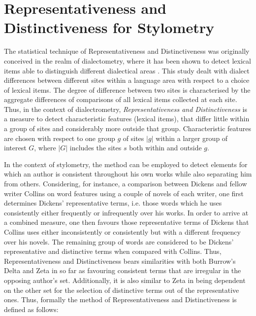 \documentclass[a4paper,10pt,twoside,fleqn]{article}
\begin{document}
\section{Representativeness and Distinctiveness for Stylometry} \label{sec:method}
The statistical technique of Representativeness and Distinctiveness was 
originally conceived in the realm of dialectometry, where it has been
shown to detect lexical items able to distinguish different dialectical 
areas \cite{prokic2012detecting}.
This study dealt with dialect differences between different sites within 
a language area with respect to a choice of lexical items. 
The degree of difference between two sites is characterised by the aggregate 
differences of comparisons of all lexical items collected at 
each site. Thus, in the context of dialectrometry, 
\emph{Representativeness and Distinctiveness} is a measure to detect characteristic 
features (lexical items), that differ little within a group of sites 
and considerably more outside that group.
Characteristic features are chosen with respect to one group $g$ of sites 
$|g|$ within a larger group of interest $G$, where $|G|$ includes the sites 
$s$ both within and outside $g$.


In the context of stylometry, the method can be employed to detect elements for 
which an author is consistent throughout his own works while also separating him 
from others. Considering, for instance, a comparison between Dickens and fellow 
writer Collins on word features using a couple of novels of each writer, 
one first determines Dickens' representative terms, i.e. those words which he
uses consistently either frequently or infrequently over his works. 
In order to arrive at a combined measure, one then favours those representative 
terms of Dickens that Collins uses either inconsistently or consistently but with a
different frequency over his novels. The remaining group of words are considered 
to be Dickens' representative and distinctive terms when compared with Collins. 
Thus, Representativeness and Distinctiveness bears similarities with both 
Burrow's Delta \cite{Burrows2002delta} and Zeta  \cite{Burrows2007all} in so far as
favouring consistent terms that are irregular in the opposing author's set. 
Additionally, it is also similar to Zeta in being dependent on the other set 
for the selection of distinctive terms out of the representative ones. 
Thus, formally the method of Representativeness and Distinctiveness is defined 
as follows: \\
\end{document}
